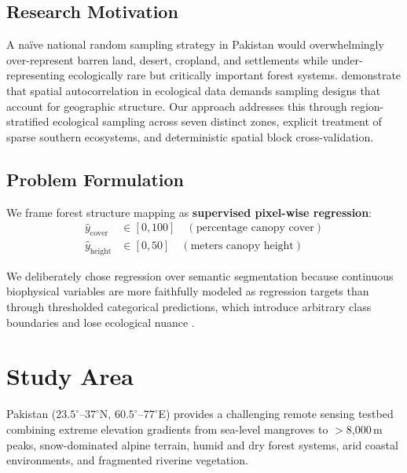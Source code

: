 \documentclass[12pt,a4paper,twoside]{article}
\begin{document}
\subsection{Research Motivation}

A na\"ive national random sampling strategy in Pakistan would overwhelmingly
over-represent barren land, desert, cropland, and settlements while
under-representing ecologically rare but critically important forest systems.
\citet{Roberts2017} demonstrate that spatial autocorrelation in ecological data
demands sampling designs that account for geographic structure.  Our approach
addresses this through region-stratified ecological sampling across seven distinct
zones, explicit treatment of sparse southern ecosystems, and deterministic spatial
block cross-validation.

\subsection{Problem Formulation}

We frame forest structure mapping as \textbf{supervised pixel-wise regression}:
\begin{align}
  \hat{y}_{\text{cover}} &\in [0, 100] \quad (\text{percentage canopy cover}) \label{eq:cover_range} \\
  \hat{y}_{\text{height}} &\in [0, 50] \quad (\text{meters canopy height}) \label{eq:height_range}
\end{align}

We deliberately chose regression over semantic segmentation because continuous
biophysical variables are more faithfully modeled as regression targets than through
thresholded categorical predictions, which introduce arbitrary class boundaries and
lose ecological nuance \citep{Belgiu2016}.

\section{Study Area}\label{sec:study_area}

Pakistan ($23.5^{\circ}$--$37^{\circ}$N, $60.5^{\circ}$--$77^{\circ}$E) provides
a challenging remote sensing testbed combining extreme elevation gradients from
sea-level mangroves to $>$8,000\,m peaks, snow-dominated alpine terrain, humid and
dry forest systems, arid coastal environments, and fragmented riverine vegetation.
\end{document}
